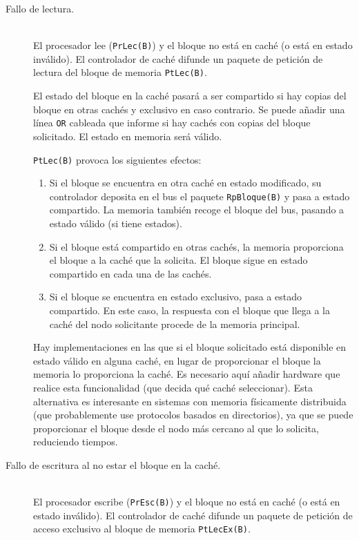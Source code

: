 \begin{description}
    \item [Fallo de lectura.]~\\
    El procesador lee (\verb|PrLec(B)|) y el bloque no está en caché (o está en estado inválido). El controlador de caché difunde un paquete de petición de lectura del bloque de memoria \verb|PtLec(B)|.

    El estado del bloque en la caché pasará a ser compartido si hay copias del bloque en otras cachés y exclusivo en caso contrario. Se puede añadir una línea \verb|OR| cableada que informe si hay cachés con copias del bloque solicitado. El estado en memoria será válido.

    \verb|PtLec(B)| provoca los siguientes efectos:
    \begin{enumerate}
        \item Si el bloque se encuentra en otra caché en estado modificado, su controlador deposita en el bus el paquete \verb|RpBloque(B)| y pasa a estado compartido. La memoria también recoge el bloque del bus, pasando a estado válido (si tiene estados).
        \item Si el bloque está compartido en otras cachés, la memoria proporciona el bloque a la caché que la solicita. El bloque sigue en estado compartido en cada una de las cachés.
        \item Si el bloque se encuentra en estado exclusivo, pasa a estado compartido. En este caso, la respuesta con el bloque que llega a la caché del nodo solicitante procede de la memoria principal.
    \end{enumerate}
    Hay implementaciones en las que si el bloque solicitado está disponible en estado válido en alguna caché, en lugar de proporcionar el bloque la memoria lo proporciona la caché. Es necesario aquí añadir hardware que realice esta funcionalidad (que decida qué caché seleccionar). Esta alternativa es interesante en sistemas con memoria físicamente distribuida (que probablemente use protocolos basados en directorios), ya que se puede proporcionar el bloque desde el nodo más cercano al que lo solicita, reduciendo tiempos.

    \item [Fallo de escritura al no estar el bloque en la caché.]~\\
        El procesador escribe (\verb|PrEsc(B)|) y el bloque no está en caché (o está en estado inválido). El controlador de caché difunde un paquete de petición de acceso exclusivo al bloque de memoria \verb|PtLecEx(B)|. 


\end{description}
